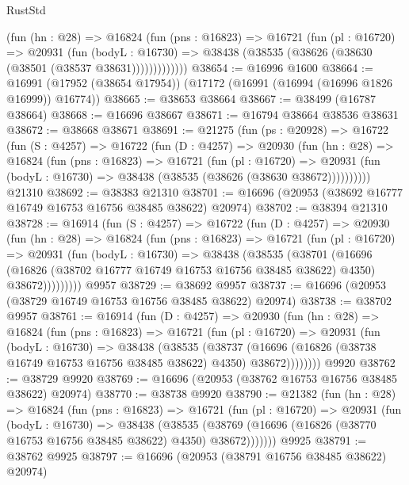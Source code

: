 \begin{lexlean}{RustStd}
\begin{coremodule}
            (fun (hn : @28) =>
            @16824
              (fun (pns : @16823) =>
              @16721
                (fun (pl : @16720) =>
                @20931
                  (fun (bodyL : @16730) =>
                  @38438 (@38535 (@38626 (@38630 (@38501 (@38537 @38631)))))))))))))
@38654 := @16996 @1600
@38664 := @16991 (@17952 (@38654 @17954)) (@17172 (@16991 (@16994 (@16996 @1826 @16999)) @16774))
@38665 := @38653 @38664
@38667 := @38499 (@16787 @38664)
@38668 := @16696 @38667
@38671 := @16794 @38664 @38536 @38631
@38672 := @38668 @38671
@38691 := @21275
    (fun (ps : @20928) =>
    @16722
      (fun (S : @4257) =>
      @16722
        (fun (D : @4257) =>
        @20930
          (fun (hn : @28) =>
          @16824
            (fun (pns : @16823) =>
            @16721
              (fun (pl : @16720) =>
              @20931 (fun (bodyL : @16730) => @38438 (@38535 (@38626 (@38630 @38672))))))))))
    @21310
@38692 := @38383 @21310
@38701 := @16696 (@20953 (@38692 @16777 @16749 @16753 @16756 @38485 @38622) @20974)
@38702 := @38394 @21310
@38728 := @16914
    (fun (S : @4257) =>
    @16722
      (fun (D : @4257) =>
      @20930
        (fun (hn : @28) =>
        @16824
          (fun (pns : @16823) =>
          @16721
            (fun (pl : @16720) =>
            @20931
              (fun (bodyL : @16730) =>
              @38438
                (@38535
                  (@38701
                    (@16696
                      (@16826 (@38702 @16777 @16749 @16753 @16756 @38485 @38622) @4350)
                      @38672)))))))))
    @9957
@38729 := @38692 @9957
@38737 := @16696 (@20953 (@38729 @16749 @16753 @16756 @38485 @38622) @20974)
@38738 := @38702 @9957
@38761 := @16914
    (fun (D : @4257) =>
    @20930
      (fun (hn : @28) =>
      @16824
        (fun (pns : @16823) =>
        @16721
          (fun (pl : @16720) =>
          @20931
            (fun (bodyL : @16730) =>
            @38438
              (@38535
                (@38737
                  (@16696 (@16826 (@38738 @16749 @16753 @16756 @38485 @38622) @4350) @38672))))))))
    @9920
@38762 := @38729 @9920
@38769 := @16696 (@20953 (@38762 @16753 @16756 @38485 @38622) @20974)
@38770 := @38738 @9920
@38790 := @21382
    (fun (hn : @28) =>
    @16824
      (fun (pns : @16823) =>
      @16721
        (fun (pl : @16720) =>
        @20931
          (fun (bodyL : @16730) =>
          @38438
            (@38535
              (@38769 (@16696 (@16826 (@38770 @16753 @16756 @38485 @38622) @4350) @38672)))))))
    @9925
@38791 := @38762 @9925
@38797 := @16696 (@20953 (@38791 @16756 @38485 @38622) @20974)

\end{coremodule}
\end{lexlean}
